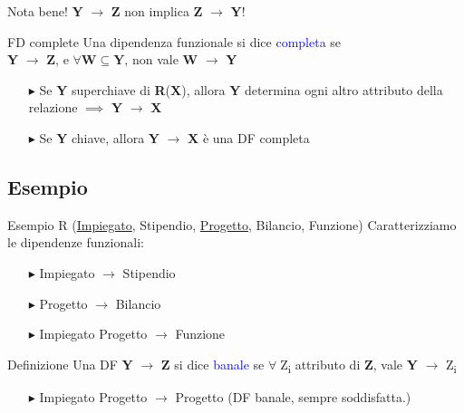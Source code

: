 \documentclass{beamer}
\begin{document}
\begin{frame}{}

    
    \begin{alertblock}{Nota bene!}
        \centering
        \textbf{Y} $\rightarrow$ \textbf{Z} non implica \textbf{Z} $\rightarrow$ \textbf{Y}!
    \end{alertblock}

    \begin{block}{FD complete}
        Una dipendenza funzionale si dice \textcolor{blue}{completa} se \\
        \centering
        \textbf{Y} $\rightarrow$ \textbf{Z}, e $\forall \textbf{W} \subseteq \textbf{Y}$, non vale \textbf{W} $\rightarrow$ \textbf{Y}
    \end{block}
    
    \begin{itemize}
        \item[$\blacktriangleright$] Se \textbf{Y} superchiave di \textbf{R}(\textbf{X}), allora \textbf{Y} determina ogni altro attributo della relazione $\implies$ \textbf{Y} $\rightarrow$ \textbf{X}
        \item[$\blacktriangleright$] Se \textbf{Y} chiave, allora \textbf{Y} $\rightarrow$ \textbf{X} è una DF completa
    \end{itemize}
    
\end{frame}

\subsection{Esempio}
\begin{frame}{Esempio}
    \Large R (\underline{Impiegato}, Stipendio, \underline{Progetto}, Bilancio, Funzione)
    \vfill
    \normalsize Caratterizziamo le dipendenze funzionali:
    \begin{itemize}
        \item[$\blacktriangleright$] Impiegato $\rightarrow$ Stipendio
        \item[$\blacktriangleright$] Progetto $\rightarrow$ Bilancio
        \item[$\blacktriangleright$] Impiegato Progetto $\rightarrow$ Funzione
    \end{itemize}

\begin{block}{Definizione}
    Una DF \textbf{Y} $\rightarrow$ \textbf{Z} si dice \textcolor{blue}{banale} se $\forall \;$Z\textsubscript{i} attributo di \textbf{Z}, vale \textbf{Y} $\rightarrow$ Z\textsubscript{i}
\end{block}
    
    \begin{itemize}
        \item[$\blacktriangleright$] Impiegato Progetto $\rightarrow$ Progetto
            (DF banale, sempre soddisfatta.)
    \end{itemize}

    
\end{frame}
\end{document}
